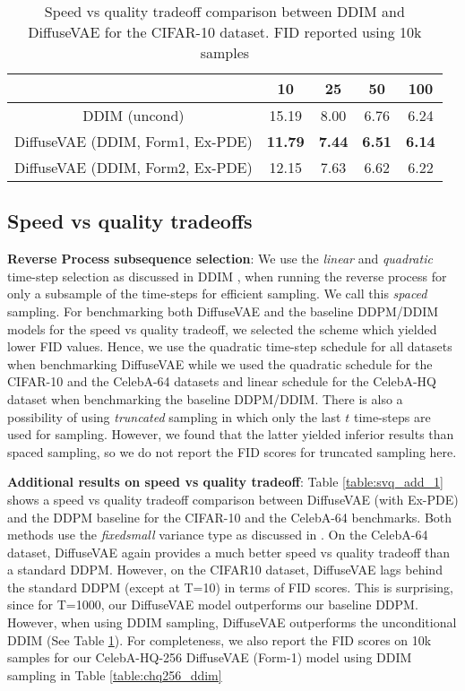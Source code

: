 \documentclass[10pt]{article} \usepackage[accepted]{tmlr}
\begin{document}
\begin{table}[]
\footnotesize
\centering
\begin{tabular}{@{}ccccc@{}}
\toprule
                                 & 10             & 25            & 50            & 100           \\ \midrule
DDIM (uncond)                    & 15.19 & 8.00 & 6.76 & 6.24 \\
DiffuseVAE (DDIM, Form1, Ex-PDE) & \textbf{11.79}         & \textbf{7.44}         & \textbf{6.51}         & \textbf{6.14}          \\
DiffuseVAE (DDIM, Form2, Ex-PDE) & 12.15          & 7.63         & 6.62          & 6.22          \\ \bottomrule
\end{tabular}
\caption{Speed vs quality tradeoff comparison between DDIM and DiffuseVAE for the CIFAR-10 dataset. FID reported using 10k samples}
\label{table:svq_add_2}
\end{table}

\subsection{Speed vs quality tradeoffs}

\textbf{Reverse Process subsequence selection}: We use the \textit{linear} and \textit{quadratic} time-step selection as discussed in DDIM \citep{song2021denoising}, when running the reverse process for only a subsample of the time-steps for efficient sampling. We call this \textit{spaced} sampling. For benchmarking both DiffuseVAE and the baseline DDPM/DDIM models for the speed vs quality tradeoff, we selected the scheme which yielded lower FID values. Hence, we use the quadratic time-step schedule for all datasets when benchmarking DiffuseVAE while we used the quadratic schedule for the CIFAR-10 and the CelebA-64 datasets and linear schedule for the CelebA-HQ dataset when benchmarking the baseline DDPM/DDIM. There is also a possibility of using \textit{truncated} sampling in which only the last $t$ time-steps are used for sampling. However, we found that the latter yielded inferior results than spaced sampling, so we do not report the FID scores for truncated sampling here.

\textbf{Additional results on speed vs quality tradeoff}:
Table \ref{table:svq_add_1} shows a speed vs quality tradeoff comparison between DiffuseVAE (with Ex-PDE) and the DDPM baseline for the CIFAR-10 and the CelebA-64 benchmarks. Both methods use the \textit{fixedsmall} variance type as discussed in \citep{ho2020denoising}. On the CelebA-64 dataset, DiffuseVAE again provides a much better speed vs quality tradeoff than a standard DDPM. However, on the CIFAR10 dataset, DiffuseVAE lags behind the standard DDPM (except at T=10) in terms of FID scores. This is surprising, since for T=1000, our DiffuseVAE model outperforms our baseline DDPM. However, when using DDIM sampling, DiffuseVAE outperforms the unconditional DDIM (See Table \ref{table:svq_add_2}).
For completeness, we also report the FID scores on 10k samples for our CelebA-HQ-256 DiffuseVAE (Form-1) model using DDIM sampling in Table \ref{table:chq256_ddim}
\end{document}
